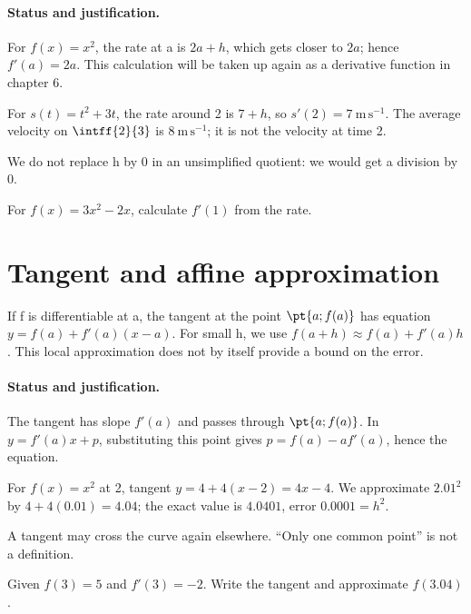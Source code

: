 \paragraph{Status and justification.} For $f(x)=x^2$, the rate at a is $2a+h$, which gets closer to $2a$; hence $f\prime(a)=2a$. This calculation will be taken up again as a derivative function in chapter 6.
\begin{example}For $s(t)=t^2+3t$, the rate around 2 is $7+h$, so $s\prime(2)=7\ \mathrm{m\,s^{-1}}$. The average velocity on $\intff{2}{3}$ is $8\ \mathrm{m\,s^{-1}}$; it is not the velocity at time 2.\end{example}\label{C04-EX2}
\begin{pitfall}We do not replace h by 0 in an unsimplified quotient: we would get a division by 0.\end{pitfall}
\begin{application}For $f(x)=3x^2-2x$, calculate $f\prime(1)$ from the rate.\end{application}\label{C04-AP2}
\section{Tangent and affine approximation}\label{C04-U3}
\begin{keypoint}
If f is differentiable at a, the tangent at the point $\pt{a;f(a)}$ has equation $y=f(a)+f\prime(a)(x-a)$. For small h, we use $f(a+h)\approx f(a)+f\prime(a)h$. This local approximation does not by itself provide a bound on the error.
\end{keypoint}
\paragraph{Status and justification.} The tangent has slope $f\prime(a)$ and passes through $\pt{a;f(a)}$. In $y=f\prime(a)x+p$, substituting this point gives $p=f(a)-af\prime(a)$, hence the equation.
\begin{example}For $f(x)=x^2$ at 2, tangent $y=4+4(x-2)=4x-4$. We approximate $\num{2,01}^2$ by $4+4(\num{0,01})=\num{4,04}$; the exact value is $\num{4,0401}$, error $\num{0,0001}=h^2$.\end{example}\label{C04-EX3}
\begin{pitfall}A tangent may cross the curve again elsewhere. ``Only one common point'' is not a definition.\end{pitfall}
\begin{application}Given $f(3)=5$ and $f\prime(3)=-2$. Write the tangent and approximate $f(\num{3,04})$.\end{application}\label{C04-AP3}

